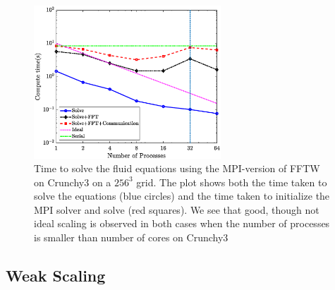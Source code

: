 \documentclass[]{article}
\begin{document}
\begin{figure}
	\centering     
	\includegraphics[width=70mm]{StrMPI.eps}
\caption{Time to solve the fluid equations using the MPI-version of FFTW on Crunchy3 on a $256^3$ grid. The plot shows both the time taken to solve the equations (blue circles) and the time taken to initialize the MPI solver and solve (red squares). We see that good, though not ideal scaling is observed in both cases when the number of processes is smaller than number of cores on Crunchy3}
\label{fig:StrongMPI}
\end{figure}
\subsection{Weak Scaling}
\end{document}

